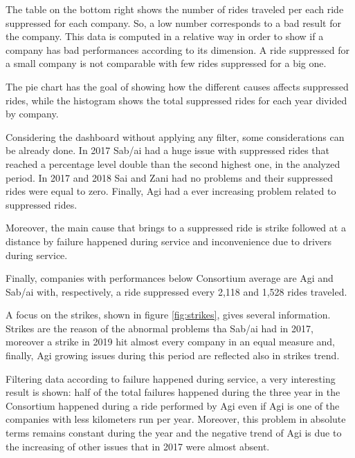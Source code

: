 The table on the bottom right shows the number of rides traveled per each ride suppressed for each company. So, a low number corresponds to a bad result for the company. This data is computed in a relative way in order to show if a company has bad performances according to its dimension. A ride suppressed for a small company is not comparable with few rides suppressed for a big one. 

The pie chart has the goal of showing how the different causes affects suppressed rides, while the histogram shows the total suppressed rides for each year divided by company. 

Considering the dashboard without applying any filter, some considerations can be already done. In 2017 Sab/ai had a huge issue with suppressed rides that reached a percentage level double than the second highest one, in the analyzed period. In 2017 and 2018 Sai and Zani had no problems and their suppressed rides were equal to zero. Finally, Agi had a ever increasing problem related to suppressed rides. 

Moreover, the main cause that brings to a suppressed ride is strike followed at a distance by failure happened during service and inconvenience due to drivers during service. 

Finally, companies with performances below Consortium average are Agi and Sab/ai with, respectively, a ride suppressed every 2,118 and 1,528 rides traveled. 

\newpage

\begin{landscape}
\thispagestyle{empty}

\end{landscape}
\newpage

A focus on the strikes, shown in figure \ref{fig:strikes}, gives several information. Strikes are the reason of the abnormal problems tha Sab/ai had in 2017, moreover a strike in 2019 hit almost every company in an equal measure and, finally, Agi growing issues during this period are reflected also in strikes trend. 

Filtering data according to failure happened during service, a very interesting result is shown: half of the total failures happened during the three year in the Consortium happened during a ride performed by Agi even if Agi is one of the companies with less kilometers run per year. Moreover, this problem in absolute terms remains constant during the year and the negative trend of Agi is due to the increasing of other issues that in 2017 were almost absent.

